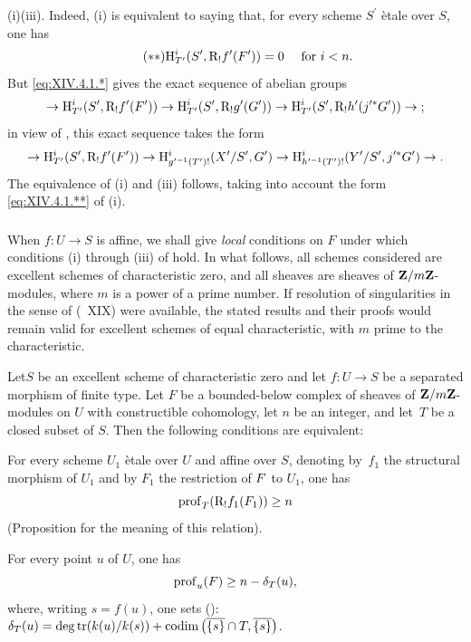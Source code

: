 \textup{(i)}\SSI\textup{(iii)}. Indeed, \textup{(i)} is equivalent to saying that, for every scheme $S^{\prime}$ \`etale over $S$, one has
\begin{equation*} \label{eq:XIV.4.1.**} \tag{$**$} {\H_{T^{\prime}}^{i}(S^{\prime}, \R_{!}f^{\prime}(F^{\prime}))=0\quad\textrm{ for }i<n.}
\end{equation*}
But \eqref{eq:XIV.4.1.*} gives the exact sequence of abelian groups
$$
\to\H_{T^{\prime}}^{i}(S^{\prime}, \R_{!}f^{\prime}(F^{\prime}))\to\H_{T^{\prime}}^{i}(S^{\prime}, \R_{!}g^{\prime}(G^{\prime}))\to \H_{T^{\prime}}^{i}(S^{\prime}, \R_{!}h^{\prime}(j^{\prime\ast}G^{\prime}))\to\;;$$
in view of , this exact sequence takes the form
$$
\to\H_{T^{\prime}}^{i}(S^{\prime}, \R_{!}f^{\prime}(F^{\prime}))\to\H_{g^{\prime -1}(T^{\prime})!}^{i}(X^{\prime}/S^{\prime}, G^{\prime})\to\H_{h^{\prime -1}(T^{\prime})!}^{i}(Y^{\prime}/S^{\prime}, j^{\prime\ast}G^{\prime})\sisi{}{\to.}$$
The equivalence of \textup{(i)} and \textup{(iii)} follows, taking into account the form \eqref{eq:XIV.4.1.**} of \textup{(i)}.

\setcounter{subsubsection}{-1} \setcounter{subsection}{2}

\subsubsection{} \label{XIV.4.2.0}
When $f\colon U\to S$ is affine, we shall give \emph{local} conditions on $F$ under which conditions \textup{(i)} through \textup{(iii)} of  hold. In what follows, all schemes considered are excellent schemes of characteristic zero, and all sheaves are sheaves of $\ZZ/m\ZZ$-modules, where $m$ is a power of a prime number. If resolution of singularities in the sense of (~XIX) were available, the stated results and their proofs would remain valid for excellent schemes of equal characteristic, with $m$ prime to the characteristic.

\setcounter{subsection}{1}

\begin{theoreme} \label{XIV.4.2}
Let\pageoriginale $S$ be an excellent scheme of characteristic zero and let \hbox{$f\colon U\!\to\! S$} be a separated morphism of finite type. Let $F$ be a bounded-below complex of sheaves of $\ZZ/m\ZZ$-modules on $U$ with constructible cohomology, let $n$ be an integer, and let~$T$ be a closed subset of $S$. Then the following conditions are equivalent:
\begin{enumeratei}
\item
For every scheme $U_{1}$ \`etale over $U$ and affine over $S$, denoting by~$f_{1}$ the structural morphism of $U_{1}$ and by $F_{1}$ the restriction of $F\sisi{_{1}}{}$ to $U_{1}$, one has
$$
\prof_{T}(\R_{!}f_{1}(F_{1}))\geq n$$
(\cf Proposition\ptbl {} for the meaning of this relation).
\item
For every point $u$ of $U$, one has
$$
\prof_{u}(F)\geq n-\delta_{T}(u),
$$
where, writing $s=f(u)$, one sets (\cf {}): $\delta_{T}(u)=\degtr(k(u)/k(s))+\codim\big(\overline{\{ s\} }\cap T, \overline{\{ s\} } \big)$.
\end{enumeratei}
\end{theoreme}


